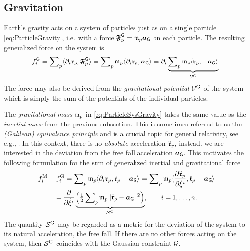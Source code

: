 \subsection{Gravitation}\label{sec:ParticleSysGravitation}
Earth's gravity acts on a system of particles just as on a single particle \eqref{eq:ParticleGravity}, i.e.\ with a force $\boldsymbol{\mathfrak{F}}_{p}^{\mathsf{G}} = \mathfrak{m}_{p} \boldsymbol{a}_{\mathsf{G}}$ on each particle.
The resulting generalized force on the system is
\begin{align}
 \genForceGravityCoeff{\LidxI}
 = \sumParticles \sProd{\dirDiff{\LidxI} \particlePos{\PidxI}}{\particleForceGravity{\PidxI}}
 = \sumParticles \particleMass{\PidxI} \sProd{\dirDiff{\LidxI}\particlePos{\PidxI}}{\gravityAcc}
 = \dirDiff{\LidxI} \underbrace{\sumParticles \particleMass{\PidxI} \sProd{\particlePos{\PidxI}}{-\gravityAcc}}_{\potentialGravity}.
\label{eq:ParticleSysGravity}
\end{align}
The force may also be derived from the \textit{gravitational potential} $\mathcal{V}^{\mathrm{G}}$ of the system which is simply the sum of the potentials of the individual particles.

The \textit{gravitational mass} $\mathfrak{m}_{p}$ in \eqref{eq:ParticleSysGravity} takes the same value as the \textit{inertial mass} from the previous subsection.
This is sometimes referred to as the \textit{(Galilean) equivalence principle} and is a crucial topic for general relativity, see e.g., \cite[chap.\,16]{Misner:Gravitation}.
In this context, there is no \textit{absolute} acceleration $\ddot{\boldsymbol{\mathfrak{r}}}_{p}$, instead, we are interested in the deviation from the free fall acceleration $\boldsymbol{a}_{\mathsf{G}}$.
This motivates the following formulation for the sum of generalized inertial and gravitational force
\begin{multline}
  \genForceInertiaCoeff{\LidxI} + \genForceGravityCoeff{\LidxI} 
  = \sumParticles \particleMass{\PidxI} \sProd{\dirDiff{\LidxI} \particlePos{\PidxI}}{\particlePosdd{\PidxI} - \gravityAcc}
  = \sumParticles \particleMass{\PidxI} \sProd{\pdiff[\particlePosdd{\PidxI}]{\sysVelCoeffd{\LidxI}}}{\particlePosdd{\PidxI} - \gravityAcc}
\\
  = \pdiff{\sysVelCoeffd{\LidxI}} \underbrace{\Big(\tfrac{1}{2} \sumParticles \particleMass{\PidxI} \norm{\particlePosdd{\PidxI} - \gravityAcc}^2\Big)}_{\accEnergyInertial},
  \qquad
  \LidxI = 1,\ldots,\dimConfigSpace.
 \label{eq:EinsteinianForce}
\end{multline}
The quantity $\mathcal{S}^{\mathrm{G}}$ may be regarded as a metric for the deviation of the system to its natural acceleration, the free fall.
If there are no other forces acting on the system, then $\mathcal{S}^{\mathrm{G}}$ coincides with the Gaussian constraint $\mathcal{G}$.

